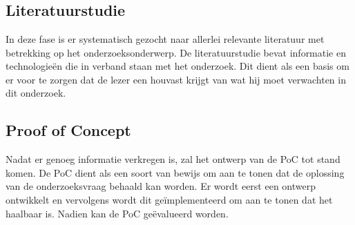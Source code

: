 
\chapter{}%
\label{ch:methodologie}

\section{Literatuurstudie}
In deze fase is er systematisch gezocht naar allerlei relevante literatuur met betrekking op het onderzoeksonderwerp. De literatuurstudie bevat informatie en technologieën die in verband staan met het onderzoek. Dit dient als een basis om er voor te zorgen dat de lezer een houvast krijgt van wat hij moet verwachten in dit onderzoek.

\section{Proof of Concept}
Nadat er genoeg informatie verkregen is, zal het ontwerp van de PoC tot stand komen. De PoC dient als een soort van bewijs om aan te tonen dat de oplossing van de onderzoeksvraag behaald kan worden. Er wordt eerst een ontwerp ontwikkelt en vervolgens wordt dit geïmplementeerd om aan te tonen dat het haalbaar is. Nadien kan de PoC geëvalueerd worden.

